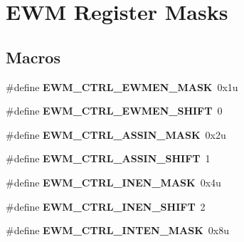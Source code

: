 \hypertarget{group__EWM__Register__Masks}{}\section{E\+WM Register Masks}
\label{group__EWM__Register__Masks}
\subsection*{Macros}
\begin{DoxyCompactItemize}
\item 
\#define {\bfseries E\+W\+M\+\_\+\+C\+T\+R\+L\+\_\+\+E\+W\+M\+E\+N\+\_\+\+M\+A\+SK}~0x1u\hypertarget{group__EWM__Register__Masks_ga7426f0a484ad28b92efb90ef0e3f01fd}{}\label{group__EWM__Register__Masks_ga7426f0a484ad28b92efb90ef0e3f01fd}

\item 
\#define {\bfseries E\+W\+M\+\_\+\+C\+T\+R\+L\+\_\+\+E\+W\+M\+E\+N\+\_\+\+S\+H\+I\+FT}~0\hypertarget{group__EWM__Register__Masks_gafac96f184ce423d5872e0ca6e258d004}{}\label{group__EWM__Register__Masks_gafac96f184ce423d5872e0ca6e258d004}

\item 
\#define {\bfseries E\+W\+M\+\_\+\+C\+T\+R\+L\+\_\+\+A\+S\+S\+I\+N\+\_\+\+M\+A\+SK}~0x2u\hypertarget{group__EWM__Register__Masks_ga24fe6289cbd9e813f99fb721d28b7bb5}{}\label{group__EWM__Register__Masks_ga24fe6289cbd9e813f99fb721d28b7bb5}

\item 
\#define {\bfseries E\+W\+M\+\_\+\+C\+T\+R\+L\+\_\+\+A\+S\+S\+I\+N\+\_\+\+S\+H\+I\+FT}~1\hypertarget{group__EWM__Register__Masks_gac397960fb320e62f5c89e057e9f5ce13}{}\label{group__EWM__Register__Masks_gac397960fb320e62f5c89e057e9f5ce13}

\item 
\#define {\bfseries E\+W\+M\+\_\+\+C\+T\+R\+L\+\_\+\+I\+N\+E\+N\+\_\+\+M\+A\+SK}~0x4u\hypertarget{group__EWM__Register__Masks_ga4366a1e4b346e8a61898588faa0ca7df}{}\label{group__EWM__Register__Masks_ga4366a1e4b346e8a61898588faa0ca7df}

\item 
\#define {\bfseries E\+W\+M\+\_\+\+C\+T\+R\+L\+\_\+\+I\+N\+E\+N\+\_\+\+S\+H\+I\+FT}~2\hypertarget{group__EWM__Register__Masks_ga64cbcf45aac428b81d2ed6aab3cd0fe2}{}\label{group__EWM__Register__Masks_ga64cbcf45aac428b81d2ed6aab3cd0fe2}

\item 
\#define {\bfseries E\+W\+M\+\_\+\+C\+T\+R\+L\+\_\+\+I\+N\+T\+E\+N\+\_\+\+M\+A\+SK}~0x8u\hypertarget{group__EWM__Register__Masks_gab5aba63161ed0c5524fff6007d84f06b}{}\label{group__EWM__Register__Masks_gab5aba63161ed0c5524fff6007d84f06b}


\end{DoxyCompactItemize}
